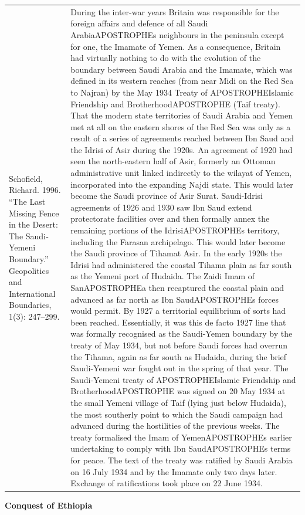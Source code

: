 {\begin{longtable}{p{}p{}}
Schofield, Richard. 1996. “The Last Missing Fence in the Desert: The Saudi‐Yemeni Boundary.” Geopolitics and International Boundaries, 1(3): 247–299. & During the inter-war years Britain was responsible for the foreign affairs and defence of all Saudi ArabiaAPOSTROPHEs neighbours in the peninsula except for one, the Imamate of Yemen. As a consequence, Britain had virtually nothing to do with the evolution of the boundary between Saudi Arabia and the Imamate, which was defined in its western reaches (from near Midi on the Red Sea to Najran) by the May 1934 Treaty of APOSTROPHEIslamic Friendship and BrotherhoodAPOSTROPHE (Taif treaty). That the modern state territories of Saudi Arabia and Yemen met at all on the eastern shores of the Red Sea was only as a result of a series of agreements reached between Ibn Saud and the Idrisi of Asir during the 1920s. An agreement of 1920 had seen the north-eastern half of Asir, formerly an Ottoman administrative unit linked indirectly to the wilayat of Yemen, incorporated into the expanding Najdi state. This would later become the Saudi province of Asir Surat. Saudi-Idrisi agreements of 1926 and 1930 saw Ibn Saud extend protectorate facilities over and then formally annex the remaining portions of the IdrisiAPOSTROPHEs territory, including the Farasan archipelago. This would later become the Saudi province of Tihamat Asir. In the early 1920s the Idrisi had administered the coastal Tihama plain as far south as the Yemeni port of Hudaida. The Zaidi Imam of SanAPOSTROPHEa then recaptured the coastal plain and advanced as far north as Ibn SaudAPOSTROPHEs forces would permit. By 1927 a territorial equilibrium of sorts had been reached. Essentially, it was this de facto 1927 line that was formally recognised as the Saudi-Yemen boundary by the treaty of May 1934, but not before Saudi forces had overrun the Tihama, again as far south as Hudaida, during the brief Saudi-Yemeni war fought out in the spring of that year. The Saudi-Yemeni treaty of APOSTROPHEIslamic Friendship and BrotherhoodAPOSTROPHE was signed on 20 May 1934 at the small Yemeni village of Taif (lying just below Hudaida), the most southerly point to which the Saudi campaign had advanced during the hostilities of the previous weeks. The treaty formalised the Imam of YemenAPOSTROPHEs earlier undertaking to comply with Ibn SaudAPOSTROPHEs terms for peace. The text of the treaty was ratified by Saudi Arabia on 16 July 1934 and by the Imamate only two days later. Exchange of ratifications took place on 22 June 1934.
\\
\end{longtable}}
\clearpage
         \textbf{Conquest of Ethiopia} 

